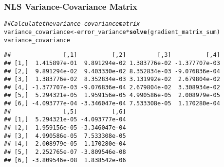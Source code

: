 \documentclass{beamer}\usepackage[]{graphicx}\usepackage[]{color}
\makeatletter
\newcommand{\hlcom}[1]{\textcolor[rgb]{0.678,0.584,0.686}{\textit{#1}}}%
\newcommand{\hlopt}[1]{\textcolor[rgb]{0,0,0}{#1}}%
\newcommand{\hlstd}[1]{\textcolor[rgb]{0.345,0.345,0.345}{#1}}%
\newcommand{\hlkwb}[1]{\textcolor[rgb]{0.69,0.353,0.396}{#1}}%
\newcommand{\hlkwc}[1]{\textcolor[rgb]{0.333,0.667,0.333}{#1}}%
\newcommand{\hlkwd}[1]{\textcolor[rgb]{0.737,0.353,0.396}{\textbf{#1}}}%
\newenvironment{kframe}{%
 \def\at@end@of@kframe{}%
 \ifinner\ifhmode%
  \def\at@end@of@kframe{\end{minipage}}%
  \begin{minipage}{\columnwidth}%
 \fi\fi%
 \def\FrameCommand##1{\hskip\@totalleftmargin \hskip-\fboxsep
 \colorbox{shadecolor}{##1}\hskip-\fboxsep
     \hskip-\linewidth \hskip-\@totalleftmargin \hskip\columnwidth}%
 \MakeFramed {\advance\hsize-\width
   \@totalleftmargin\z@ \linewidth\hsize
   \@setminipage}}%
 {\par\unskip\endMakeFramed%
 \at@end@of@kframe}
\newenvironment{knitrout}{}{} %
\makeatother
\begin{document}

\begin{frame}[fragile]\frametitle{NLS Variance-Covariance Matrix}
\begin{knitrout}\footnotesize
{}\color{fgcolor}\begin{kframe}
\begin{alltt}
\hlcom{## Calculate the variance-covariance matrix}
\hlstd{variance_covariance} \hlkwb{<-} \hlstd{error_variance} \hlopt{*} \hlkwd{solve}\hlstd{(gradient_matrix_sum)}
\hlstd{variance_covariance}
\end{alltt}
\begin{verbatim}
##               [,1]          [,2]         [,3]          [,4]
## [1,]  1.415897e-01  9.891294e-02 1.383776e-02 -1.377707e-03
## [2,]  9.891294e-02  9.403330e-02 8.352834e-03 -9.076836e-04
## [3,]  1.383776e-02  8.352834e-03 3.131992e-02  2.679804e-02
## [4,] -1.377707e-03 -9.076836e-04 2.679804e-02  3.308934e-02
## [5,]  5.294321e-05  1.959156e-05 4.990586e-05  2.008979e-05
## [6,] -4.093777e-04 -3.346047e-04 7.533308e-05  1.170280e-04
##               [,5]          [,6]
## [1,]  5.294321e-05 -4.093777e-04
## [2,]  1.959156e-05 -3.346047e-04
## [3,]  4.990586e-05  7.533308e-05
## [4,]  2.008979e-05  1.170280e-04
## [5,]  2.252765e-07 -3.809546e-08
## [6,] -3.809546e-08  1.838542e-06
\end{verbatim}
\end{kframe}
\end{knitrout}
\end{frame}
\end{document}
